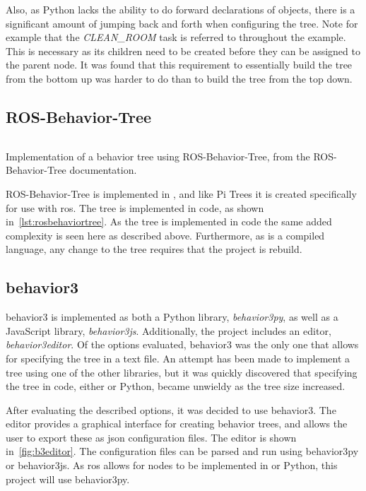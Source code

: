 \documentclass[\rootfolder/main.tex]{subfiles}
\begin{document}
Also, as Python lacks the ability to do forward declarations of objects, there is a significant amount of jumping back and forth when configuring the tree.
Note for example that the \emph{CLEAN\_ROOM} task is referred to throughout the example.
This is necessary as its children need to be created before they can be assigned to the parent node.
It was found that this requirement to essentially build the tree from the bottom up was harder to do than to build the tree from the top down.

\subsection{ROS-Behavior-Tree}

\begin{listing}
    \inputminted[fontsize=\scriptsize]{Python}{\rootfolder/Chapters/Chapter3/Listings/rosbehaviortree.cpp}
    \caption[Implementation of a behavior tree using ROS-Behavior-Tree.]{Implementation of a behavior tree using ROS-Behavior-Tree, from the ROS-Behavior-Tree documentation.}
    \label{lst:rosbehaviortree}
\end{listing}

ROS-Behavior-Tree is implemented in \CC, and like Pi Trees it is created specifically for use with \acrshort{ros}.
The tree is implemented in code, as shown in~\cref{lst:rosbehaviortree}.
As the tree is implemented in code the same added complexity is seen here as described above.
Furthermore, as \CC is a compiled language, any change to the tree requires that the project is rebuild.

\subsection{behavior3}

behavior3 is implemented as both a Python library, \emph{behavior3py}, as well as a JavaScript library, \emph{behavior3js}.
Additionally, the project includes an editor, \emph{behavior3editor}.
Of the options evaluated, behavior3 was the only one that allows for specifying the tree in a text file.
An attempt has been made to implement a tree using one of the other libraries, but it was quickly discovered that specifying the tree in code, either \CC or Python, became unwieldy as the tree size increased.

After evaluating the described options, it was decided to use behavior3.
The editor provides a graphical interface for creating behavior trees, and allows the user to export these as \acrshort{json} configuration files.
The editor is shown in~\cref{fig:b3editor}.
The configuration files can be parsed and run using behavior3py or behavior3js.
As \acrshort{ros} allows for nodes to be implemented in \CC or Python, this project will use behavior3py.
\end{document}
